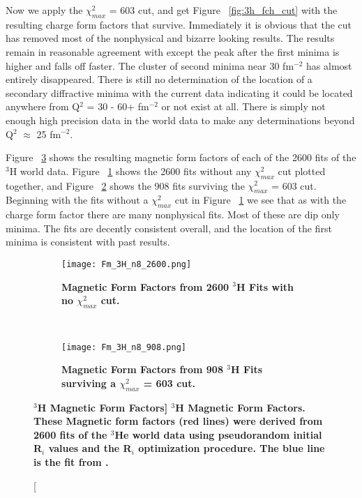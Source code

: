 Now we apply the $\chi^2_{max}$ = 603 cut, and get Figure ~\ref{fig:3h_fch_cut} with the resulting charge form factors that survive. Immediately it is obvious that the cut has removed most of the nonphysical and bizarre looking results. The results remain in reasonable agreement with \cite{Article:Amroun} except the peak after the first minima is higher and falls off faster. The cluster of second minima near 30 fm$^{-2}$ has almost entirely disappeared. There is still no determination of the location of a secondary diffractive minima with the current data indicating it could be located anywhere from  Q$^2$ = 30 - 60+ fm$^{-2}$ or not exist at all. There is simply not enough high precision data in the world data to make any determinations beyond Q$^2$ $\approx$ 25 fm$^{-2}$.

Figure ~\ref{fig:3h_fm} shows the resulting magnetic form factors of each of the 2600 fits of the $^3$H world data. Figure ~\ref{fig:3h_fm_no_cut} shows the 2600 fits without any $\chi^2_{max}$ cut plotted together, and Figure ~\ref{fig:3h_fm_cut} shows the 908 fits surviving the $\chi^2_{max}$ = 603 cut. Beginning with the fits without a $\chi^2_{max}$ cut in Figure ~\ref{fig:3h_fm_no_cut} we see that as with the charge form factor there are many nonphysical fits. Most of these are dip only minima. The fits are decently consistent overall, and the location of the first minima is consistent with past results. 

\begin{figure}[!ht]
\begin{subfigure}{1.\textwidth}
  \centering
  \texttt{[image: Fm\_3H\_n8\_2600.png]}
  \caption{\bf{Magnetic Form Factors from 2600 $^3$H Fits with no $\chi^2_{max}$ cut.}}
  \label{fig:3h_fm_no_cut}
\end{subfigure}\\
\begin{subfigure}{1.\textwidth}
  \centering
  \texttt{[image: Fm\_3H\_n8\_908.png]}
  \caption{\bf{Magnetic Form Factors from 908 $^3$H Fits surviving a $\chi^2_{max}$ = 603 cut.}}
  \label{fig:3h_fm_cut}
\end{subfigure}
\caption[\bf{$^3$H Magnetic Form Factors}] {
{\bf{$^3$H Magnetic Form Factors.}} These Magnetic form factors (red lines) were derived from 2600 fits of the $^3$He world data using pseudorandom initial R$_i$ values and the R$_i$ optimization procedure. The blue line is the fit from \cite{Article:Amroun}.}
\label{fig:3h_fm}
\end{figure}

